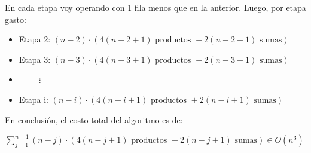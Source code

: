 \documentclass[]{article}
\begin{document}
En cada etapa voy operando con 1 fila menos que en la anterior. Luego, por etapa gasto:
\begin{itemize}
	\item Etapa 2: $(n-2)\cdot(4(n-2+1) \text{ productos } + 2(n-2+1) \text{ sumas})$
	\item Etapa 3: $(n-3)\cdot(4(n-3+1) \text{ productos } + 2(n-3+1) \text{ sumas})$
	\item $\hspace{1cm}\vdots$
	\item Etapa i: $(n-i)\cdot(4(n-i+1) \text{ productos } + 2(n-i+1) \text{ sumas})$
\end{itemize}



En conclusión, el costo total del algoritmo es de:
\begin{center}
	$\displaystyle \sum_{j=1}^{n-1}{(n-j)\cdot(4(n-j+1) \text{ productos } + 2(n-j+1) \text{ sumas})} \in O(n^3)$
\end{center}
\end{document}

